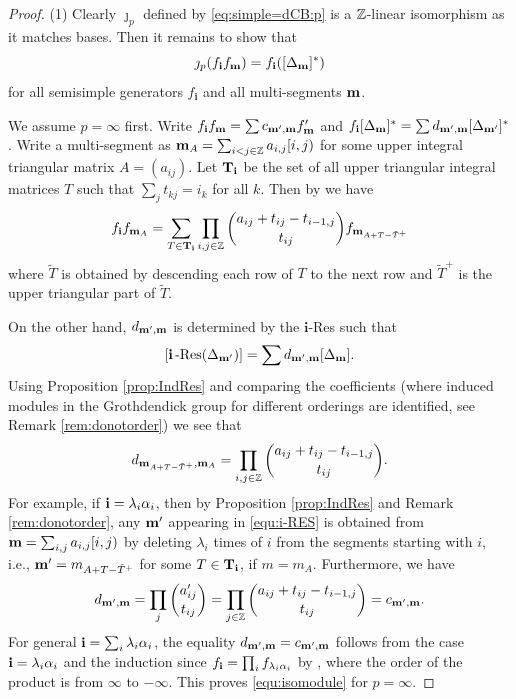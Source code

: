 \begin{proof}
(1) Clearly $\jmath_p$ defined by \eqref{eq:simple=dCB:p} is a $\mathbb{Z}$-linear isomorphism as it matches bases. Then it remains to show that 
    \begin{equation}
    \label{equ:isomodule}
        \jmath_p(f_{\mathbf i}f_{\mathbf{m}}) = f_{\mathbf i} ([\Delta_{\mathbf{m}}]^*)
    \end{equation} 
for all semisimple generators $ f_{\mathbf i}$ and all multi-segments $\mathbf{m}$.

We assume $p=\infty$ first.
Write $f_{\mathbf i}f_{\mathbf{m}}=\sum c_{\mathbf{m}',\mathbf{m}}f_{\mathbf{m}}'$
and $f_{\mathbf i} [\Delta_{\mathbf{m}}]^* =\sum d_{\mathbf{m}',\mathbf{m}}  [\Delta_{\mathbf{m}'}]^*$.
Write a multi-segment as $\mathbf{m}_A=\sum_{i<j\in \mathbb{Z}}a_{i,j}[i,j)$ for some  upper integral  triangular  matrix $A=(a_{ij})$. Let $\mathbf T_{\mathbf{i}}$
be the set of all upper triangular integral matrices $T$ such that $\sum_{j}t_{kj}=i_k$ for all $k$. Then by \cite[Proposition 4.2]{DF15}
we have 
\[
f_{\mathbf{i}} f_{\mathbf{m}_A}= \sum_{ T\in \mathbf T_{\mathbf{i}}} \prod_{i,j\in\mathbb{Z}} \binom{a_{ij}+t_{ij}-t_{i-1,j}}{t_{ij}} f_{\mathbf{m}_{A+T-\tilde T^+} }   
\]
where 
$ \tilde T$ is obtained by descending each row of $T$  to the next row and $\tilde T^+$ is the upper triangular part of $\tilde T$. 


On the other hand, $d_{\mathbf{m}',\mathbf{m}} $ is determined by the $\mathbf i$-Res such that 
\begin{equation}
\label{equ:i-RES}
  [\mathbf{i}\operatorname{-Res}\nolimits(\Delta_{\mathbf{m}'})]= \sum d_{\mathbf{m}',\mathbf{m}}[\Delta_{\mathbf{m}}].  
\end{equation}
Using Proposition \ref{prop:IndRes} and comparing the coefficients (where induced modules in the Grothdendick group for different orderings are identified, see Remark \ref{rem:donotorder}) we  see that 
\[d_{\mathbf{m}_{A+T-\tilde T^+},\mathbf{m}_A}= \prod_{i,j\in\mathbb{Z}} \binom{a_{ij}+t_{ij}-t_{i-1,j}}{t_{ij}}.\]
For example, if $\mathbf{i}=\lambda_i\alpha_i$, then by Proposition \ref{prop:IndRes} and Remark \ref{rem:donotorder}, 
any $\mathbf{m}'$ appearing in \eqref{equ:i-RES} is obtained from $\mathbf{m}=\sum_{i,j}a_{i,j}[i,j)$ by deleting $\lambda_i$ times of $i$ from the segments starting with $i$, i.e., 
$\mathbf{m}'=m_{A+T-\tilde T^+}$ for some $T\in \mathbf T_{\mathbf{i}}$, if $m=m_A$.
Furthermore, we have 
\[d_{\mathbf{m}',\mathbf{m}}=\prod_{j}\binom{a'_{ij}}{t_{ij}} =\prod_{j\in \mathbb{Z}} \binom{a_{ij}+t_{ij}-t_{i-1,j}}{t_{ij}}=c_{\mathbf{m}',\mathbf{m}}.\]
For general $\mathbf{i}=\sum_{i}\lambda_i\alpha_i$, the equality $d_{\mathbf{m}',\mathbf{m}}=c_{\mathbf{m}',\mathbf{m}}$ follows from the case $\mathbf{i}=\lambda_i\alpha_i$ and the induction since 
$f_{\mathbf{i}}=\prod_{i}f_{\lambda_i\alpha_i}$ by \cite[Remark 6.1]{VV99}, where the order of the product is from $\infty$ to $-\infty$. This proves \eqref{equ:isomodule} for  $p=\infty$. 


\end{proof}

